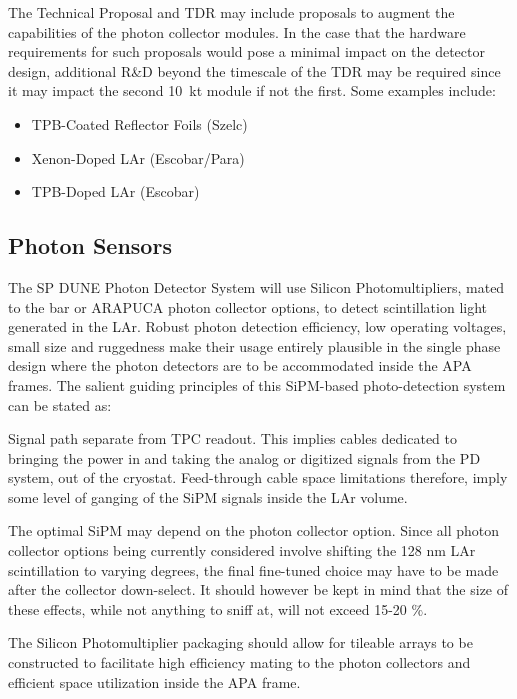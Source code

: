 The Technical Proposal and TDR may include proposals to augment the capabilities of the photon
collector modules. In the case that the hardware requirements for such proposals would pose a minimal
impact on the detector design, additional R\&D beyond the timescale of the TDR may be required since it may impact the second 10~kt module if not the first. 
Some examples include:
\begin{itemize}
\item TPB-Coated Reflector Foils (Szelc)
\item Xenon-Doped LAr (Escobar/Para)
\item TPB-Doped LAr (Escobar)
\end{itemize}

\subsection{Photon Sensors}
\label{sec:fdsp-pd-ps}
The SP DUNE Photon Detector System will use Silicon Photomultipliers, mated to
the bar or ARAPUCA photon collector options, to detect
scintillation light generated in the LAr. Robust photon detection efficiency, low operating
voltages, small size and ruggedness make their usage entirely plausible in the single
phase design where the photon detectors are to be accommodated inside the APA 
frames. The salient guiding principles of this SiPM-based photo-detection system can be stated
as:

Signal path separate from TPC readout. This implies cables dedicated to bringing the power
in and taking the analog or digitized signals from the PD system, out of the cryostat. 
Feed-through cable space limitations therefore, imply some level of ganging of the SiPM
signals inside the LAr volume. 

The optimal SiPM may depend on the photon collector option. Since all photon collector
options being currently considered involve shifting the 128 nm LAr scintillation to 
varying degrees, the final fine-tuned choice may have to be made after the collector
down-select. It should however be kept in mind that the size of these effects, while not 
anything to sniff at, will not exceed 15-20 $\%$.

The Silicon Photomultiplier packaging should allow for tileable arrays to be constructed to
facilitate high efficiency mating to the photon collectors and efficient space utilization inside
the APA frame.

